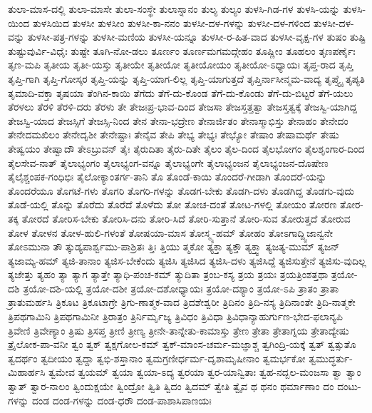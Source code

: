 {ತುಲಾ-ಮಾಸ-ದಲ್ಲಿ
ತುಲಾ-ಮಾಸೇ
ತುಲಾ-ಸಂಸ್ಥೇ
ತುಲಾಸ್ನಾನಂ
ತುಲ್ಯ
ತುಲ್ಯಂ
ತುಳಸಿ-ಗಿಡ-ಗಳ
ತುಳಸಿ-ಯನ್ನು
ತುಳಸಿ-ಯಿಂದ
ತುಳಸಿಯಿದ
ತುಳಸೀ
ತುಳಸೀಂ
ತುಳಸೀ-ಕಾ-ನನಂ
ತುಳಸೀ-ದಳ-ಗಳನ್ನು
ತುಳಸೀ-ದಳ-ಗಳಿಂದ
ತುಳಸೀ-ದಳ-ವನ್ನು
ತುಳಸೀ-ಪತ್ರ-ಗಳನ್ನು
ತುಳಸೀ-ಮಣಿಯ
ತುಳಸೀ-ಯನ್ನೂ
ತುಳಸೀ-ರ-ಹಿತ-ವಾದ
ತುಳಸೀ-ವೃಕ್ಷ-ಗಳ
ತುಷಂ
ತುಷ್ಟಿ
ತುಷ್ಟುವುರ್ವಿ-ವಿಧೈಃ
ತುಷ್ಟೇ
ತೂಗಿ-ನೋ-ಡಲು
ತೂರ್ಣಂ
ತೂರ್ಣಮಗಮದ್ಗೇಹಂ
ತೂಷ್ಣೀಂ
ತೂಹಲಂ
ತೃಣಪರ್ಣೈಃ
ತೃಣ-ಮಪಿ
ತೃತೀಯ
ತೃತೀ-ಯಸ್ತು
ತೃತೀಯೇ
ತೃತೀಯೋ
ತೃತೀಯೋಯಂ
ತೃತೀಯೋ-ಽಧ್ಯಾಯಃ
ತೃಪ್ತ-ರಾದ
ತೃಪ್ತಿ
ತೃಪ್ತಿ-ಗಾಗಿ
ತೃಪ್ತಿ-ಗೋಸ್ಕರ
ತೃಪ್ತಿ-ಯನ್ನು
ತೃಪ್ತಿ-ಯಾಗ-ಲಿಲ್ಲ
ತೃಪ್ತಿ-ಯಾಗುತ್ತದೆ
ತೃಪ್ತಿರ್ನಾಸೀನ್ಮಮ-ವಾದ್ಯ
ತೃಪ್ತ್ಯೈ
ತೃಪ್ಯತಿ
ತೃಮಾದಿ-ವಕ್ತಾ
ತೃಷಯಾ
ತೆಂಗಿನ-ಕಾಯಿ
ತೆಗೆದು
ತೆಗೆ-ದು-ಕೊಂಡ
ತೆಗೆ-ದು-ಕೊಂಡು
ತೆಗೆ-ದು-ಬಿಟ್ಟರೆ
ತೆಗೆ-ಯಲು
ತೆರಳಲು
ತೆರಳಿ
ತೆರಳಿ-ದರು
ತೆರಳು
ತೇ
ತೇಜಃಪ್ರ-ಭಾವ-ದಿಂದ
ತೇಜಸಾ
ತೇಜಸ್ತತ್ತತ್ವಾ
ತೇಜಸ್ತತ್ವಕ್ಕೆ
ತೇಜಸ್ವಿ-ಯಾಗಿದ್ದ
ತೇಜಸ್ವಿ-ಯಾದ
ತೇಜಸ್ಸಿಗೆ
ತೇಜಸ್ಸಿ-ನಿಂದ
ತೇನ
ತೇನಾ-ಭದ್ರೇಣ
ತೇನಾರ್ಜಿತಂ
ತೇನಾಸ್ಮಾಭಿಸ್ತು
ತೇನಾಹಂ
ತೇನೇದಂ
ತೇನೇದಮಖಿಲಂ
ತೇನೇದೃಶೀ
ತೇನೇಷ್ಟಾಃ
ತೇನೈವ
ತೇಪಿ
ತೇಭ್ಯ
ತೇಭ್ಯಃ
ತೇಭ್ಯೋ
ತೇಷಾಂ
ತೇಷಾಮರ್ಥೆ
ತೇಷು
ತೇಷ್ವಯಂ
ತೇಷ್ವಾದೌ
ತೇಽಬ್ರುವನ್
ತೈಃ
ತೈರುದಿತಾ
ತೈರು-ದಿತೇ
ತೈಲಂ
ತೈಲ-ದಿಂದ
ತೈಲಭೋಗಂ
ತೈಲಶೃಂಗಾರ-ದಿಂದ
ತೈಲಸೇವ-ನಾತ್
ತೈಲಾಭ್ಯಂಗಂ
ತೈಲಾಭ್ಯಂಗ-ವನ್ನೂ
ತೈಲಾಭ್ಯಂಗೇ
ತೈಲಾಭ್ಯಂಜನ
ತೈಲಾಭ್ಯಂಜನ-ದೊಷೇಣ
ತೈಲೈಶ್ಚಂಪಕ-ಗಂಧಿಭಿಃ
ತೈಲೋಕ್ಯಾಂತರ್ಗ-ತಾನಿ
ತೊ
ತೊಂಡೆ-ಕಾಯಿ
ತೊಂದರೆ-ಗೀಡಾಗಿ
ತೊಂದರೆ-ಯನ್ನು
ತೊಂದರೆಯೂ
ತೊಗಟೆ-ಗಳು
ತೊಗರಿ
ತೊಗರಿ-ಗಳನ್ನು
ತೊಡಗ-ಬೇಕು
ತೊಡಗಿ-ದಳು
ತೊಡಗಿದ್ದ
ತೊಡಗು-ವುದು
ತೊಡೆ-ಯಲ್ಲಿ
ತೊನ್ನು
ತೊರೆದು
ತೊರೆದೆ
ತೊಳೆದು
ತೋ
ತೋಚ-ದಂತೆ
ತೋಟ-ಗಳಲ್ಲಿ
ತೋಯಂ
ತೋರಣ
ತೋರ-ತಕ್ಕ
ತೋರದೆ
ತೋರಿಸ-ಬೇಕು
ತೋರಿಸಿ-ದನು
ತೋರಿ-ಸಿದೆ
ತೋರಿ-ಸುತ್ತಾನೆ
ತೋರಿ-ಸುವ
ತೋರುತ್ತದೆ
ತೋರುವ
ತೋಳ
ತೋಳನ
ತೋಳ-ಹುಲಿ-ಗಳಂತೆ
ತೋಷಯಾ-ಮಾಸ
ತೋಸ್ಮ್ಯ-ಹಮ್
ತೋಹಂ
ತೋಽಗಾದ್ದ್ವಿಜಾನ್ವನೇ
ತೋಽಮುನಾ
ತೌ
ತ್ಕುಡ್ಯಪಾರ್ಶ್ವಮು-ಪಾಶ್ರಿತಃ
ತ್ತಿಃ
ತ್ತಿಯು
ತ್ಮಕೋ
ತ್ಯಕ್ತಾ
ತ್ಯಕ್ತೌ
ತ್ಯಕ್ತ್ವಾ
ತ್ಯಜತ್ಯ-ಮುಮ್
ತ್ಯಜನ್
ತ್ಯಜಾಮ್ಯ-ಹಮ್
ತ್ಯಜಿ-ತಾನಾಂ
ತ್ಯಜಿಸ-ಬೇಕೆಂದು
ತ್ಯಜಿಸಿ
ತ್ಯಜಿಸಿದ
ತ್ಯಜಿಸಿ-ದಳು
ತ್ಯಜಿಸಿದ್ದೆ
ತ್ಯಜಿಸುತ್ತೇನೆ
ತ್ಯಜಿಸು-ವುದಿಲ್ಲ
ತ್ಯಜೇತ್ತು
ತ್ಯಹಂ
ತ್ಯಾ
ತ್ಯಾಗ
ತ್ಯಾತ್ತೇ
ತ್ಯಾಧಿ-ಪಂಚ-ಕಮ್
ತ್ಯುದಿತಾ
ತ್ರಂಬ-ಕಸ್ಯ
ತ್ರಯ
ತ್ರಯಃ
ತ್ರಯತ್ರಿಂಶತ್ತಥಾ
ತ್ರಯೋ-ದಶಿ
ತ್ರಯೋ-ದಶಿ-ಯಲ್ಲಿ
ತ್ರಯೋ-ದಶೀ
ತ್ರಯೋ-ದಶೋಧ್ಯಾಯಃ
ತ್ರಯೋ-ದಶ್ಯಾಂ
ತ್ರಯೋ-ಽಪಿ
ತ್ರಾತಂ
ತ್ರಾತಾ
ತ್ರಾತುಮರ್ಹಸಿ
ತ್ರಿಕೂಟ
ತ್ರಿಕೂಟಾಗ್ರೇ
ತ್ರಿಗು-ಣಾತ್ಮಕ-ವಾದ
ತ್ರಿದಶೇಶ್ವರೀ
ತ್ರಿದಿನಂ
ತ್ರಿದಿ-ನಸ್ಯ
ತ್ರಿದಿನಾಂತೇ
ತ್ರಿದಿ-ನಾತ್ಮಕೇ
ತ್ರಿಪಥಗಾಮಿನಿ
ತ್ರಿಪಥಗಾಮಿನೀ
ತ್ರಿರಾತ್ರಂ
ತ್ರಿರ್ನಿರ್ಮೃಜ್ಯ
ತ್ರಿವಿಧಂ
ತ್ರಿವಿಧಾ
ತ್ರಿವಿಧಾನ್ಯಾಹುರ್ಗುಣ-ಭೇದ-ಫಲಾನ್ಯಪಿ
ತ್ರಿವೇಣಿ
ತ್ರಿವೇಣ್ಯಾಂ
ತ್ರಿಷು
ತ್ರಿಸಪ್ತ
ತ್ರೀಣಿ
ತ್ರೀಣ್ಯ
ತ್ರೀನೇ-ತಾನ್ನೇತು-ಕಾಮಾಸ್ತು
ತ್ರೇಣ
ತ್ರೇತಾ
ತ್ರೇತಾಗ್ನಯ
ತ್ರೇತಾದ್ಯೇಷು
ತ್ರೈಲೋಕ-ಪಾ-ವನೀ
ತ್ವಂ
ತ್ವಕ್
ತ್ವಕ್ಷಗೋಲ-ಕಮ್
ತ್ವಕ್-ಮಾಂಸ-ಚರ್ಮ-ಮಜ್ಞಾಶ್ಚ
ತ್ವಗಿಂದ್ರಿ-ಯಕ್ಕೆ
ತ್ವತ್
ತ್ವತ್ಸುತೊ
ತ್ವದರ್ಥಂ
ತ್ವದೀಯಂ
ತ್ವದ್ದಾ
ತ್ವಭಿ-ಶಸ್ತಾನಾಂ
ತ್ವಮಗ್ರಣೀರ್ಧರ್ಮ-ದೃಶಾಮೃಷೀನಾಂ
ತ್ವಮರ್ಭಕೋ
ತ್ವಮುದ್ಧರ್ತು-ಮಿಹಾರ್ಹಸಿ
ತ್ವಮೇವ
ತ್ವಯಮ್
ತ್ವಯಾ
ತ್ವಯಾ-ಽದ್ಯ
ತ್ವರಯಾ
ತ್ವರ-ಯಾನ್ವಿತಾಃ
ತ್ವಹ-ನದ್ಬಲ-ಮಂಜಸಾ
ತ್ವಾ
ತ್ವಾಂ
ತ್ವಾತ್
ತ್ವಾರ-ನಾಲಂ
ತ್ವಿಂದುಕ್ಷಯೇ
ತ್ವಿಂದ್ರೋ
ತ್ವಿತಿ
ತ್ವಿದಂ
ತ್ವಿದಮ್
ತ್ವೇತಿ
ತ್ವೈವ
ಥ
ಥನಂ
ಥರ್ಮಾಣಾಂ
ದಂ
ದಂಟು-ಗಳನ್ನು
ದಂಡ
ದಂಡ-ಗಳನ್ನು
ದಂಡ-ಧರೌ
ದಂಡ-ಪಾಶಾಸಿಪಾಣಯಃ
}
